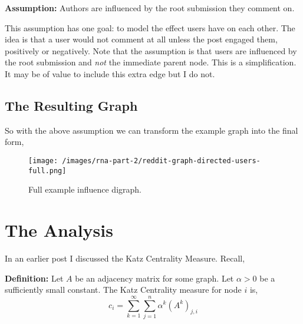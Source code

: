 \textbf{Assumption:} Authors are influenced by the root submission they comment on.

This assumption has one goal: to model the effect users have on each other.
The idea is that a user would not comment at all unless the post engaged them, positively or negatively.
Note that the assumption is that users are influenced by the root submission and \emph{not} the immediate parent node.
This is a simplification. It may be of value to include this extra edge but I do not.

\subsection{The Resulting Graph}
So with the above assumption we can transform the example graph into the final form,
%
\begin{figure}
    \texttt{[image: /images/rna-part-2/reddit-graph-directed-users-full.png]}
    \caption{Full example influence digraph.}
\end{figure}
%

\section{The Analysis}
In an earlier post I discussed the Katz Centrality Measure. Recall,

\textbf{Definition:} Let \(A\) be an adjacency matrix for some graph.
Let \(\alpha > 0\) be a sufficiently small constant.
The Katz Centrality measure for node \(i\) is,
\[
  c_i = \sum_{k=1}^{\infty}{ \sum_{j=1}^{n}{ \alpha^k (A^k)_{j,i} } }
\]


